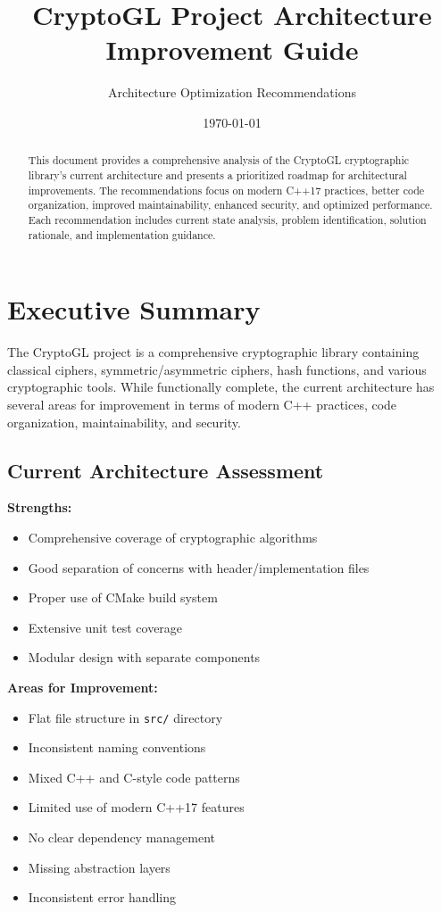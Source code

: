 \documentclass[11pt,a4paper]{article}
\begin{document}
\title{\Huge\textbf{CryptoGL Project Architecture\\Improvement Guide}}
\author{Architecture Optimization Recommendations}
\date{\today}

\maketitle

\begin{abstract}
This document provides a comprehensive analysis of the CryptoGL cryptographic library's current architecture and presents a prioritized roadmap for architectural improvements. The recommendations focus on modern C++17 practices, better code organization, improved maintainability, enhanced security, and optimized performance. Each recommendation includes current state analysis, problem identification, solution rationale, and implementation guidance.
\end{abstract}

\tableofcontents
\newpage

\section{Executive Summary}

The CryptoGL project is a comprehensive cryptographic library containing classical ciphers, symmetric/asymmetric ciphers, hash functions, and various cryptographic tools. While functionally complete, the current architecture has several areas for improvement in terms of modern C++ practices, code organization, maintainability, and security.

\subsection{Current Architecture Assessment}

\textbf{Strengths:}
\begin{itemize}
    \item Comprehensive coverage of cryptographic algorithms
    \item Good separation of concerns with header/implementation files
    \item Proper use of CMake build system
    \item Extensive unit test coverage
    \item Modular design with separate components
\end{itemize}

\textbf{Areas for Improvement:}
\begin{itemize}
    \item Flat file structure in \texttt{src/} directory
    \item Inconsistent naming conventions
    \item Mixed C++ and C-style code patterns
    \item Limited use of modern C++17 features
    \item No clear dependency management
    \item Missing abstraction layers
    \item Inconsistent error handling
\end{itemize}
\end{document}
